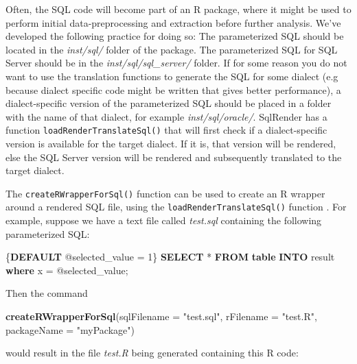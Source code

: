 \documentclass[]{article}
\newenvironment{Shaded}{\begin{snugshade}}{\end{snugshade}}
\newcommand{\DataTypeTok}[1]{\textcolor[rgb]{0.13,0.29,0.53}{#1}}
\newcommand{\DecValTok}[1]{\textcolor[rgb]{0.00,0.00,0.81}{#1}}
\newcommand{\KeywordTok}[1]{\textcolor[rgb]{0.13,0.29,0.53}{\textbf{#1}}}
\newcommand{\NormalTok}[1]{#1}
\newcommand{\StringTok}[1]{\textcolor[rgb]{0.31,0.60,0.02}{#1}}
\begin{document}
Often, the SQL code will become part of an R package, where it might be
used to perform initial data-preprocessing and extraction before further
analysis. We've developed the following practice for doing so: The
parameterized SQL should be located in the \emph{inst/sql/} folder of
the package. The parameterized SQL for SQL Server should be in the
\emph{inst/sql/sql\_server/} folder. If for some reason you do not want
to use the translation functions to generate the SQL for some dialect
(e.g because dialect specific code might be written that gives better
performance), a dialect-specific version of the parameterized SQL should
be placed in a folder with the name of that dialect, for example
\emph{inst/sql/oracle/}. SqlRender has a function
\texttt{loadRenderTranslateSql()} that will first check if a
dialect-specific version is available for the target dialect. If it is,
that version will be rendered, else the SQL Server version will be
rendered and subsequently translated to the target dialect.

The \texttt{createRWrapperForSql()} function can be used to create an R
wrapper around a rendered SQL file, using the
\texttt{loadRenderTranslateSql()} function . For example, suppose we
have a text file called \emph{test.sql} containing the following
parameterized SQL:

\begin{Shaded}
\begin{Highlighting}[]
\NormalTok{\{}\KeywordTok{DEFAULT}\NormalTok{ @selected_value = }\DecValTok{1}\NormalTok{\}}
\KeywordTok{SELECT}\NormalTok{ * }\KeywordTok{FROM} \KeywordTok{table} \KeywordTok{INTO}\NormalTok{ result }\KeywordTok{where}\NormalTok{ x = @selected_value;}
\end{Highlighting}
\end{Shaded}

Then the command

\begin{Shaded}
\begin{Highlighting}[]
\KeywordTok{createRWrapperForSql}\NormalTok{(}\DataTypeTok{sqlFilename =} \StringTok{"test.sql"}\NormalTok{, }
                     \DataTypeTok{rFilename =} \StringTok{"test.R"}\NormalTok{, }
                     \DataTypeTok{packageName =} \StringTok{"myPackage"}\NormalTok{)}
\end{Highlighting}
\end{Shaded}

would result in the file \emph{test.R} being generated containing this R
code:
\end{document}
